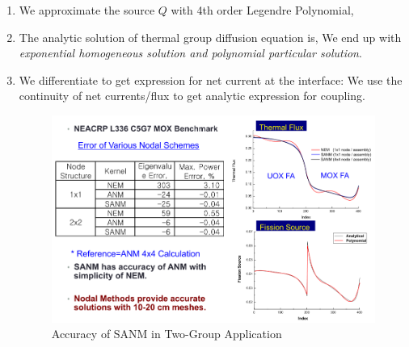 \documentclass{school-22.211-notes}
\begin{document}
\begin{enumerate}
\begin{enumerate}
  \item We approximate the source $Q$ with 4th order Legendre Polynomial, 
    
  \item The analytic solution of thermal group diffusion equation is, 
    We end up with \textit{exponential homogeneous solution and polynomial particular solution}. 

\item We differentiate to get expression for net current at the interface: 
    We use the continuity of net currents/flux to get analytic expression for coupling. 
    \begin{figure}[ht]
      \centering
      \includegraphics[width=5in]{images/methd/SANM-accuracy.png}
      \caption{Accuracy of SANM in Two-Group Application}
    \end{figure}
  \end{enumerate}
\end{enumerate}
\end{document}
